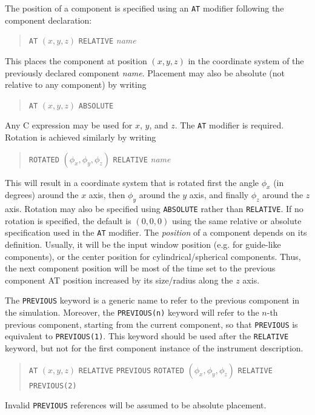 The position of a component is specified using an \texttt{AT} modifier
following the component declaration:
  
\begin{quote}
  \texttt{AT} $(x,y,z)$ \texttt{RELATIVE} \textit{name}
\end{quote}
This places the component at position $(x,y,z)$ in the coordinate system
of the previously declared component \textit{name}. Placement may also
be absolute (not relative to any component) by writing
\begin{quote}
  \texttt{AT} $(x,y,z)$ \texttt{ABSOLUTE}
\end{quote}
Any C expression may be used for $x$, $y$, and $z$. The \texttt{AT}
modifier is required.
Rotation is achieved similarly by writing 
\begin{quote}
  \texttt{ROTATED} $(\phi_x,\phi_y,\phi_z)$ \texttt{RELATIVE} \textit{name}
\end{quote}
This will result in a coordinate system that is rotated first the angle
$\phi_x$ (in degrees) around the $x$ axis, then $\phi_y$ around the $y$ axis, and finally
$\phi_z$ around the $z$ axis. Rotation may also be specified using
\texttt{ABSOLUTE} rather than \texttt{RELATIVE}. If no rotation is
specified, the default is $(0,0,0)$ using the same relative or absolute
specification used in the \texttt{AT} modifier. The \emph{position} of a component depends on its definition. Usually, it will be the input window position (e.g. for guide-like components), or the center position for cylindrical/spherical components. Thus, the next component position will be most of the time set to the previous component AT position increased by its size/radius along the $z$ axis.

The \texttt{PREVIOUS}  keyword is a generic name to refer to the previous component in the simulation. Moreover, the \texttt{PREVIOUS(n)} keyword will refer to the $n$-th previous component, starting from the current component, so that \texttt{PREVIOUS} is equivalent to \texttt{PREVIOUS(1)}. This keyword should be used after the \texttt{RELATIVE} keyword, but not for the first component instance of the instrument description.
\begin{quote}
  \texttt{AT} $(x,y,z)$ \texttt{RELATIVE} \texttt{PREVIOUS}
  \texttt{ROTATED} $(\phi_x,\phi_y,\phi_z)$ \texttt{RELATIVE} \texttt{PREVIOUS(2)}
\end{quote}
Invalid \texttt{PREVIOUS} references will be assumed to be absolute placement.

